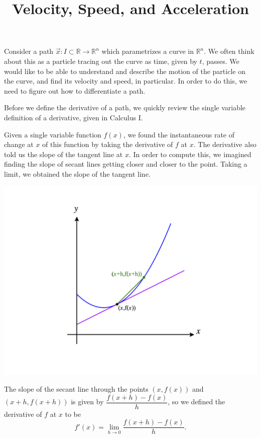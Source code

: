 \documentclass{ximera}
\title{Velocity, Speed, and Acceleration}
\begin{document}
\begin{abstract}
\end{abstract}
\maketitle


Consider a path $\vec{x}:I\subset\mathbb{R}\rightarrow\mathbb{R}^n$ which parametrizes a curve in $\mathbb{R}^n$. We often think about this as a particle tracing out the curve as time, given by $t$, passes. We would like to be able to understand and describe the motion of the particle on the curve, and find its velocity and speed, in particular. In order to do this, we need to figure out how to differentiate a path.

Before we define the derivative of a path, we quickly review the single variable definition of a derivative, given in Calculus I.

Given a single variable function $f(x)$, we found the instantaneous rate of change at $x$ of this function by taking the derivative of $f$ at $x$. The derivative also told us the slope of the tangent line at $x$. In order to compute this, we imagined finding the slope of secant lines getting closer and closer to the point. Taking a limit, we obtained the slope of the tangent line.

\begin{image}
\includegraphics[width=\textwidth]{CalcPlot3D-sv_deriv}
\end{image}

The slope of the secant line through the points $(x,f(x))$ and $(x+h,f(x+h))$ is given by $\dfrac{f(x+h)-f(x)}{h}$, so we defined the derivative of $f$ at $x$ to be
\[
f'(x) = \lim_{h\rightarrow 0}\frac{f(x+h)-f(x)}{h}.
\]
\end{document}
